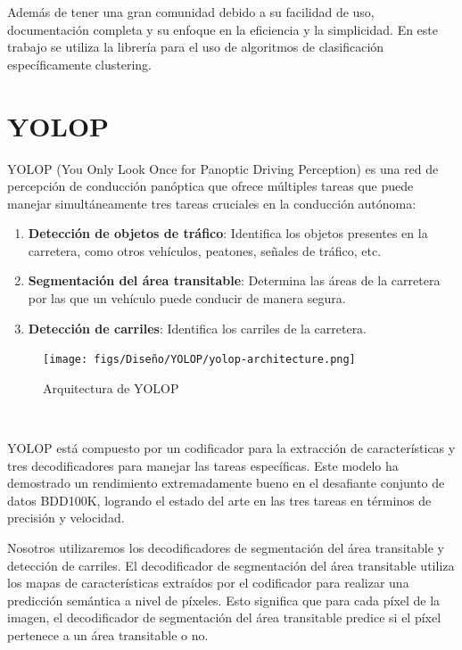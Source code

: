 Además de tener una gran comunidad debido a su facilidad de uso, documentación completa y su enfoque en la eficiencia y la simplicidad. En este trabajo se utiliza la librería para el uso
de algoritmos de clasificación específicamente clustering. 


\section{YOLOP}
\label{sec:YOLOP}
YOLOP \cite{YOLOP} (You Only Look Once for Panoptic Driving Perception) es una red de percepción
de conducción panóptica que ofrece múltiples tareas que puede
manejar simultáneamente tres tareas cruciales en la conducción autónoma: 
\begin{enumerate}
  \item \textbf{Detección de objetos de tráfico}: Identifica los objetos presentes en la carretera, como otros vehículos, peatones, señales de tráfico, etc.
  \item \textbf{Segmentación del área transitable}: Determina las áreas de la carretera por las que un vehículo puede conducir de manera segura.
  \item \textbf{Detección de carriles}: Identifica los carriles de la carretera.
\end{enumerate}

\begin{figure} [H]
  \begin{center}
    \texttt{[image: figs/Diseño/YOLOP/yolop-architecture.png]}
  \end{center}
  \caption{Arquitectura de YOLOP}
  \label{fig:Arq_YOLOP}
\end{figure}\

YOLOP está compuesto por un codificador para la extracción de características y tres decodificadores para manejar las tareas específicas. Este modelo ha demostrado un rendimiento 
extremadamente bueno en el desafiante conjunto de datos BDD100K\cite{BDD100K}, logrando el estado del arte en las tres tareas en términos de precisión y velocidad. \newline

Nosotros utilizaremos los decodificadores de segmentación del área transitable 
y detección de carriles. El decodificador de segmentación del área transitable utiliza los mapas de características
extraídos por el codificador para realizar una predicción semántica a nivel de píxeles. Esto significa que 
para cada píxel de la imagen, el decodificador de segmentación del área transitable predice si el píxel 
pertenece a un área transitable o no. \newline

